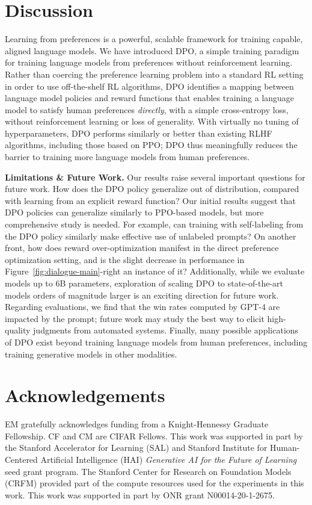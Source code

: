\documentclass{article}
\begin{document}
\section{Discussion}
Learning from preferences is a powerful, scalable framework for training capable, aligned language models. We have introduced DPO, a simple training paradigm for training language models from preferences without reinforcement learning. Rather than coercing the preference learning problem into a standard RL setting in order to use off-the-shelf RL algorithms, DPO identifies a mapping between language model policies and reward functions that enables training a language model to satisfy human preferences \textit{directly}, with a simple cross-entropy loss, without reinforcement learning or loss of generality. With virtually no tuning of hyperparameters, DPO performs similarly or better than existing RLHF algorithms, including those based on PPO; DPO thus meaningfully reduces the barrier to training more language models from human preferences.

\textbf{Limitations \& Future Work.} Our results raise several important questions for future work. How does the DPO policy generalize out of distribution, compared with learning from an explicit reward function? Our initial results suggest that DPO policies can generalize similarly to PPO-based models, but more comprehensive study is needed. For example, can training with self-labeling from the DPO policy similarly make effective use of unlabeled prompts? On another front, how does reward over-optimization manifest in the direct preference optimization setting, and is the slight decrease in performance in Figure~\ref{fig:dialogue-main}-right an instance of it? Additionally, while we evaluate models up to 6B parameters, exploration of scaling DPO to state-of-the-art models orders of magnitude larger is an exciting direction for future work. Regarding evaluations, we find that the win rates computed by GPT-4 are impacted by the prompt; future work may study the best way to elicit high-quality judgments from automated systems. Finally, many possible applications of DPO exist beyond training language models from human preferences, including training generative models in other modalities.

\section*{Acknowledgements}
EM gratefully acknowledges funding from a Knight-Hennessy Graduate Fellowship. CF and CM are CIFAR Fellows. This work was supported in part by the Stanford Accelerator for Learning (SAL) and Stanford Institute for Human-Centered Artificial Intelligence (HAI) \textit{Generative AI for the Future of Learning} seed grant program. The Stanford Center for Research on Foundation Models (CRFM) provided part of the compute resources used for the experiments in this work. This work was supported in part by ONR grant N00014-20-1-2675.
\end{document}
